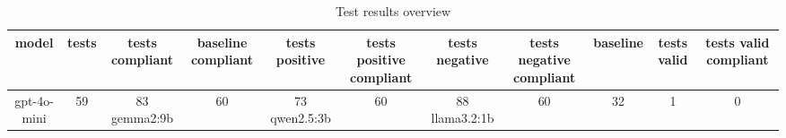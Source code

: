 
  \begin{table}[h!]
  \centering
  \begin{tabular}{|c|c|c|c|c|c|c|c|c|c|c|}
  \hline
  model & tests & tests compliant & baseline compliant & tests positive & tests positive compliant & tests negative & tests negative compliant & baseline & tests valid & tests valid compliant \\
  \hline
  gpt-4o-mini & 59 & 83%
\hline
gemma2:9b & 60 & 73%
\hline
qwen2.5:3b & 60 & 88%
\hline
llama3.2:1b & 60 & 32%
\hline
 & 1 & 0%
  \end{tabular}
  \caption{Test results overview}
  
  \end{table}
  